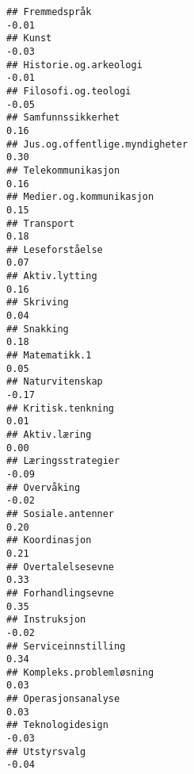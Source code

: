 \documentclass[
]{article}
\begin{document}
\begin{verbatim}
## Fremmedspråk                                                                     -0.01
## Kunst                                                                            -0.03
## Historie.og.arkeologi                                                            -0.01
## Filosofi.og.teologi                                                              -0.05
## Samfunnssikkerhet                                                                 0.16
## Jus.og.offentlige.myndigheter                                                     0.30
## Telekommunikasjon                                                                 0.16
## Medier.og.kommunikasjon                                                           0.15
## Transport                                                                         0.18
## Leseforståelse                                                                    0.07
## Aktiv.lytting                                                                     0.16
## Skriving                                                                          0.04
## Snakking                                                                          0.18
## Matematikk.1                                                                      0.05
## Naturvitenskap                                                                   -0.17
## Kritisk.tenkning                                                                  0.01
## Aktiv.læring                                                                      0.00
## Læringsstrategier                                                                -0.09
## Overvåking                                                                       -0.02
## Sosiale.antenner                                                                  0.20
## Koordinasjon                                                                      0.21
## Overtalelsesevne                                                                  0.33
## Forhandlingsevne                                                                  0.35
## Instruksjon                                                                      -0.02
## Serviceinnstilling                                                                0.34
## Kompleks.problemløsning                                                           0.03
## Operasjonsanalyse                                                                 0.03
## Teknologidesign                                                                  -0.03
## Utstyrsvalg                                                                      -0.04

\end{verbatim}
\end{document}
